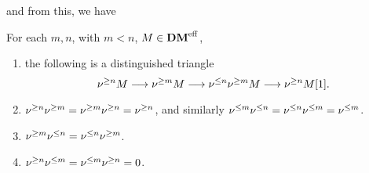 and from this, we have

\begin{prop}
For each $m, n$, with $m < n$, $M \in \mathbf{DM}^{\mathrm{eff}}$,

\begin{enumerate}
\item the following is a distinguished triangle
\begin{equation}
\nu^{\geq n}M \longrightarrow \nu^{\geq m}M \longrightarrow \nu^{\leq n}\nu^{\geq m}M \longrightarrow \nu^{\geq n}M[1].
\end{equation}

\item $\nu^{\geq n}\nu^{\geq m} = \nu^{\geq m}\nu^{\geq n} = \nu^{\geq n}$, and 
similarly $\nu^{\leq m}\nu^{\leq n} = \nu^{\leq n}\nu^{\leq m} = \nu^{\leq m}$.

\item $\nu^{\geq m}\nu^{\leq n} = \nu^{\leq n}\nu^{\geq m}$.

\item $\nu^{\geq n}\nu^{\leq m} = \nu^{\leq m}\nu^{\geq n} = 0$.
\end{enumerate}
\end{prop}

